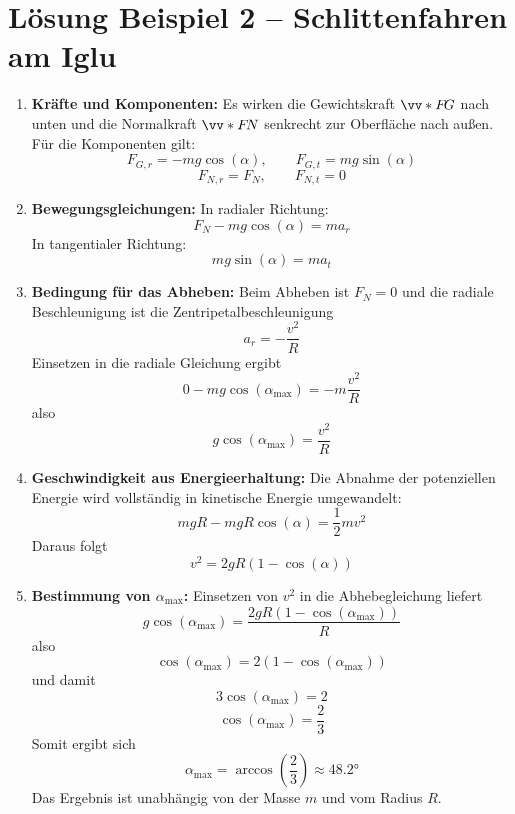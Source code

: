 \documentclass[11pt, a4paper]{article}
\begin{document}
\newpage

\section*{Lösung Beispiel 2 -- Schlittenfahren am Iglu}
\begin{enumerate}
    \item \textbf{Kräfte und Komponenten:}
    Es wirken die Gewichtskraft $\ivecS{F}{G}$ nach unten und die Normalkraft $\ivecS{F}{N}$ senkrecht zur Oberfläche nach außen.
    Für die Komponenten gilt:
    \[
        F_{G,r} = -mg\cos(\alpha), \qquad F_{G,t} = mg\sin(\alpha)
    \]
    \[
        F_{N,r} = F_N, \qquad F_{N,t} = 0
    \]

    \item \textbf{Bewegungsgleichungen:}
    In radialer Richtung:
    \[
        F_N - mg\cos(\alpha) = m a_r
    \]
    In tangentialer Richtung:
    \[
        mg\sin(\alpha) = m a_t
    \]

    \item \textbf{Bedingung für das Abheben:}
    Beim Abheben ist $F_N = 0$ und die radiale Beschleunigung ist die Zentripetalbeschleunigung
    \[
        a_r = -\frac{v^2}{R}
    \]
    Einsetzen in die radiale Gleichung ergibt
    \[
        0 - mg\cos(\alpha_{\text{max}}) = -m\frac{v^2}{R}
    \]
    also
    \[
        g\cos(\alpha_{\text{max}}) = \frac{v^2}{R}
    \]

    \item \textbf{Geschwindigkeit aus Energieerhaltung:}
    Die Abnahme der potenziellen Energie wird vollständig in kinetische Energie umgewandelt:
    \[
        mgR - mgR\cos(\alpha) = \frac{1}{2}mv^2
    \]
    Daraus folgt
    \[
        v^2 = 2gR(1-\cos(\alpha))
    \]

    \item \textbf{Bestimmung von $\alpha_{\text{max}}$:}
    Einsetzen von $v^2$ in die Abhebegleichung liefert
    \[
        g\cos(\alpha_{\text{max}}) = \frac{2gR(1-\cos(\alpha_{\text{max}}))}{R}
    \]
    also
    \[
        \cos(\alpha_{\text{max}}) = 2(1-\cos(\alpha_{\text{max}}))
    \]
    und damit
    \[
        3\cos(\alpha_{\text{max}}) = 2
    \]
    \[
        \cos(\alpha_{\text{max}}) = \frac{2}{3}
    \]
    Somit ergibt sich
    \[
        \alpha_{\text{max}} = \arccos\!\left(\frac{2}{3}\right) \approx \ang{48.2}
    \]
    Das Ergebnis ist unabhängig von der Masse $m$ und vom Radius $R$.
\end{enumerate}

\newpage
\end{document}
